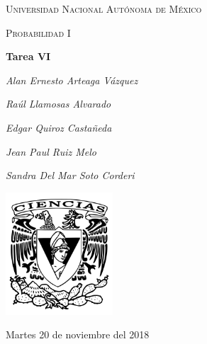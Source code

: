 \documentclass[11pt,a4paper]{report}
\begin{document}
	\begin{titlepage}
		\centering
		{\scshape\LARGE Universidad Nacional Autónoma de México \par}
		\vspace{1cm}
		{\scshape\Large Probabilidad I\par}
		\vspace{1.5cm}
		{\huge\bfseries Tarea VI\par}
		\vspace{.5cm}

		{\Large\itshape Alan Ernesto Arteaga Vázquez \par}
		 \vspace{.5cm}
		{\Large\itshape Raúl Llamosas Alvarado \par}
		 \vspace{.5cm}
		{\Large\itshape Edgar Quiroz Castañeda \par}
	    \vspace{.5cm}
		{\Large\itshape Jean Paul Ruiz Melo\par}
		\vspace{.5cm}
		{\Large\itshape Sandra Del Mar Soto Corderi \par}

		\vfill
		 \includegraphics[width=0.3\textwidth]{escudo.png}
		\vfill

		{\large Martes 20 de noviembre del 2018 \par}
	\end{titlepage}

	\pagebreak
	\setlength{\voffset}{-0.75in}
	\setlength{\headsep}{5pt}
\end{document}
